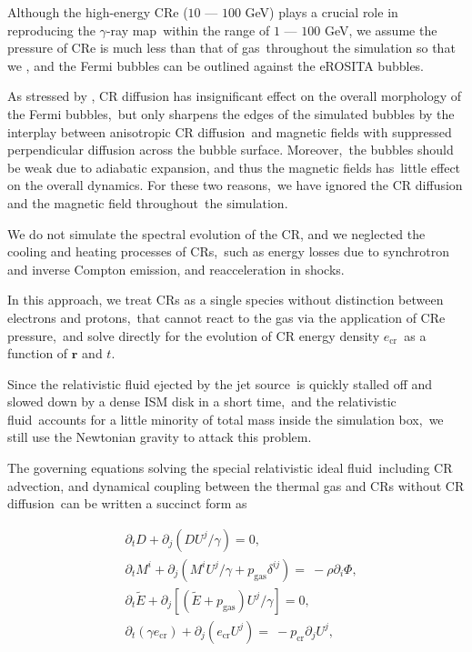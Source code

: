 \documentclass[twocolumn]{aastex631}
\begin{document}
  Although the high-energy CRe ($10$ --- $100$ GeV) plays a crucial role in reproducing the $\gamma$-ray map\
  within the range of $1$ --- $100$ GeV, we assume the pressure of CRe is much less than that of gas\
  throughout the simulation so that we , and the Fermi bubbles can be outlined against the eROSITA bubbles.

  As stressed by \citet{Yang2012}, CR diffusion has insignificant effect on the overall morphology of the Fermi bubbles,\
  but only sharpens the edges of the simulated bubbles by the interplay between anisotropic CR diffusion\
  and magnetic fields with suppressed perpendicular diffusion across the bubble surface. Moreover,\
  the bubbles should be weak due to adiabatic expansion, and thus the magnetic fields has\
  little effect on the overall dynamics. For these two reasons,\
  we have ignored the CR diffusion and the magnetic field throughout\
  the simulation.

  We do not simulate the spectral evolution of the CR, and we neglected the cooling and heating processes of CRs,\
  such as energy losses due to synchrotron and inverse Compton emission, and reacceleration in shocks.\

  In this approach, we treat CRs as a single species without distinction between electrons and protons,\
  that cannot react to the gas via the application of CRe pressure,\
  and solve directly for the evolution of CR energy density $e_{\text{cr}}$\
  as a function of $\mathbf{r}$ and $t$.\

  Since the relativistic fluid ejected by the jet source\
  is quickly stalled off and slowed down by a dense ISM disk in a short time,\
  and the relativistic fluid\
  accounts for a little minority of total mass inside the simulation box,\
  we still use the Newtonian gravity to attack this problem.

  The governing equations solving the special relativistic ideal fluid\
  including CR advection, and dynamical coupling between the thermal gas and CRs without CR diffusion\
  can be written a succinct form as


  \begin{subequations}
    \label{governing-eq}
    \begin{align}
     &\partial_{t} D+\partial_{j} \left(DU^{j}/\gamma\right)=0,\label{D evolution}\\
     &\partial_{t} M^{i}+\partial_{j} \left(M^{i}U^{j}/\gamma+p_{\text{gas}}\delta^{ij}\right)=\
     -\rho\partial_{i}\Phi,\label{M evolution}\\
     &\partial_{t} \tilde{E}+\partial_j \left[\left(\tilde{E}+p_{\text{gas}}\right)U^{j}/\gamma\right]=0, \label{E evoltion}\\
     &\partial_{t} \left(\gamma e_{\text{cr}}\right) + \partial_{j} \left(e_{\text{cr}}U^{j}\right)=\
     -p_{\text{cr}} \partial_{j} U^{j},\label{D evolution}
    \end{align}
  \end{subequations}
\end{document}
